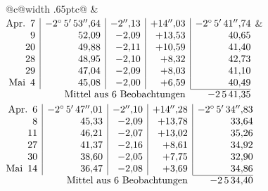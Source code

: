 \noindent\begin{tabular}{@{}c@{\hspace{.4em}\vrule width .65pt\hspace{.4em}}c@{}}
 &
 \\[.18ex]
\(\begin{array}[t]{@{}r|r|r|r|r@{}}
\text{Apr.}\enspace 7 & -2^\circ\,5'\,53''{,}64 & -2''{,}13 & +14''{,}03 & -2^\circ\,5'\,41''{,}74\\
9 & 52{,}09 & -2{,}09 & +13{,}53 & 40{,}65\\
20 & 49{,}88 & -2{,}11 & +10{,}59 & 41{,}40\\
28 & 48{,}95 & -2{,}10 & +8{,}32 & 42{,}73\\
29 & 47{,}04 & -2{,}09 & +8{,}03 & 41{,}10\\
\text{Mai}\enspace 4 & 45{,}08 & -2{,}00 & +6{,}59 & 40{,}49\\
\cline{5-5}
\multicolumn{4}{r}{\text{Mittel aus 6 Beobachtungen}} & -2\,5\,41{,}35
\end{array}\)
&
\(\begin{array}[t]{@{}r|r|r|r|r@{}}
\text{Apr.}\enspace 6 & -2^\circ\,5'\,47''{,}01 & -2''{,}10 & +14''{,}28 & -2^\circ\,5'\,34''{,}83\\
8 & 45{,}33 & -2{,}09 & +13{,}78 & 33{,}64\\
11 & 46{,}21 & -2{,}07 & +13{,}02 & 35{,}26\\
27 & 41{,}37 & -2{,}16 & +8{,}61 & 34{,}92\\
30 & 38{,}60 & -2{,}05 & +7{,}75 & 32{,}90\\
\text{Mai}\enspace 14 & 36{,}47 & -2{,}08 & +3{,}69 & 34{,}86\\
\cline{5-5}
\multicolumn{4}{r}{\text{Mittel aus 6 Beobachtungen}} & -2\,5\,34{,}40
\end{array}\)
\end{tabular}\par\medskip

\par\clearpage
\noindent\makebox[12mm][l]{}\par\medskip

